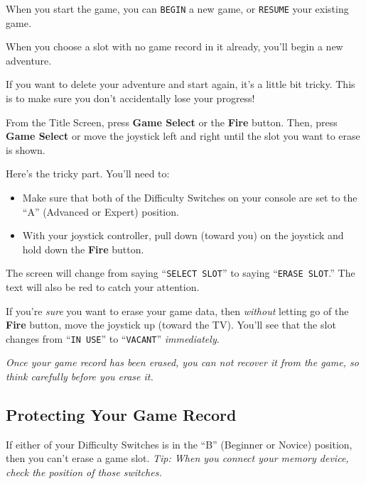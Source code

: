 \documentclass[10pt,twocolumn,openany,article]{memoir}
\begin{document}
\begin{description}
\ifdefined\NOSAVE

When  you  start  the  game,  you can  \texttt{BEGIN}  a  new  game,  or
\texttt{RESUME} your existing game.

\else

When you choose a  slot with no game record in  it already, you'll begin
a new adventure.

If you want to delete your adventure  and start again, it's a little bit
tricky. This is to make sure you don't accidentally lose your progress!

From the  Title Screen, press  \textbf{Game Select} or the  \textbf{Fire} button.
Then, press  \textbf{Game Select}  or move the  joystick left  and right
until the slot you want to erase is shown.

Here's the tricky part. You'll need to:

\begin{itemize}
\item Make sure that both of the Difficulty Switches on your console
  are set to the ``A'' (Advanced or Expert) position.
\item With your joystick controller, pull down (toward you) on the
  joystick and hold down the \textbf{Fire} button.
\end{itemize}

The screen  will change from  saying ``\texttt{SELECT SLOT}''  to saying
``\texttt{ERASE  SLOT}.''   The  text   will  also   be  red   to  catch
your attention.

If  you're  \emph{sure}   you  want  to  erase  your   game  data,  then
\emph{without}  letting go  of the  \textbf{Fire}  button, move  the joystick  up
(toward  the TV).  You'll see  that the  slot changes  from ``\texttt{IN
  USE}'' to ``\texttt{VACANT}'' \emph{immediately}.

\emph{Once your game record has been erased, you can not recover it from
  the game, so think carefully before you erase it.}

\subsection{Protecting Your Game Record}

If  either of  your Difficulty  Switches is  in the  ``B'' (Beginner  or
Novice) position, then you can't erase  a game slot. \emph{Tip: When you
  connect your memory device, check the position of those switches.}

\ifdefined\TVSECAM


\end{description}
\end{document}

